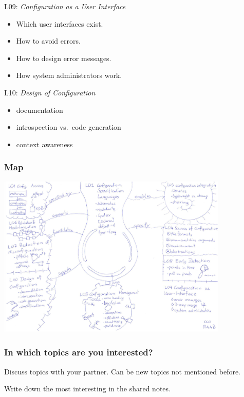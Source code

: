 \begin{frame}
	L09: \textit{Configuration as a User Interface}
	\begin{itemize}
		\item Which user interfaces exist.
		\item How to avoid errors.
		\item How to design error messages.
		\item How system administrators work.
	\end{itemize}
\end{frame}

\begin{frame}
	L10: \textit{Design of Configuration}
	\begin{itemize}
		\item documentation
		\item introspection vs.\ code generation
		\item context awareness
	\end{itemize}
\end{frame}

\begin{frame}
	\frametitle{Map}

	\includegraphics[width=11cm]{pics/map.pdf}
\end{frame}

\begin{assignment}
	\frametitle{In which topics are you interested?}
	\begin{task}[1]
	Discuss topics with your partner.
	Can be new topics not mentioned before.
	\end{task}

	\begin{task}[2]
	Write down the most interesting in the shared notes.
	\end{task}
\end{assignment}


